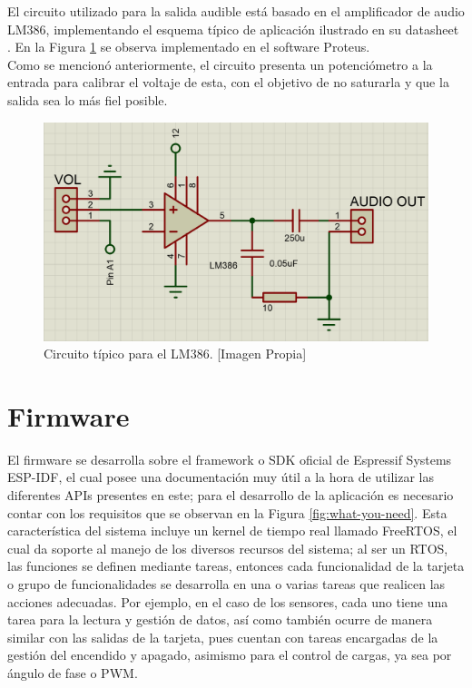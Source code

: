 		El circuito utilizado para la salida audible está basado en el amplificador de audio LM386, implementando el esquema típico de aplicación ilustrado en su datasheet \cite{LM386}. En la Figura \ref{fig:AUD} se observa implementado en el software Proteus.\\
		
		Como se mencionó anteriormente, el circuito presenta un potenciómetro a la entrada para calibrar el voltaje de esta, con el objetivo de no saturarla y que la salida sea lo más fiel posible.\\
		
		\begin{figure}[H]
			\centering
			\caption[Circuito típico para el LM386.]{Circuito típico para el LM386.  [Imagen Propia]}
			\label{fig:AUD}
			\includegraphics[width=0.7\linewidth]{Imagenes/AUD}
		\end{figure}		
				
\section{Firmware}

El firmware se desarrolla sobre el framework o SDK oficial de Espressif Systems ESP-IDF, el cual posee una documentación \cite{ES} muy útil a la hora de utilizar las diferentes APIs presentes en este; para el desarrollo de la aplicación es necesario contar con los requisitos que se observan en la Figura \ref{fig:what-you-need}. Esta característica del sistema incluye un kernel de tiempo real llamado FreeRTOS, el cual da soporte al manejo de los diversos recursos del sistema; al ser un RTOS, las funciones se definen mediante tareas, entonces cada funcionalidad de la tarjeta o grupo de funcionalidades se desarrolla en una o varias tareas que realicen las acciones adecuadas. Por ejemplo, en el caso de los sensores, cada uno tiene una tarea para la lectura y gestión de datos, así como también ocurre de manera similar con las salidas de la tarjeta, pues cuentan con tareas encargadas de la gestión del encendido y apagado, asimismo para el control de cargas, ya sea por ángulo de fase o PWM.\\

